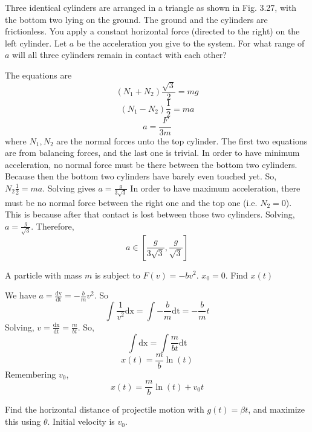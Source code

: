 \documentclass[11pt]{scrartcl}
\newcommand{\ca}[1]{\mathrm{#1}}
\begin{document}
\begin{example}
  [3.33]
\end{example}
\begin{soln}
\end{soln}
\begin{example}
  [3.34]
  Three identical cylinders are arranged in a triangle as shown in Fig. 3.27,
  with the bottom two lying on the ground. The ground and the cylinders
  are frictionless. You apply a constant horizontal force (directed to the
  right) on the left cylinder. Let $a$ be the acceleration you give to the
  system. For what range of $a$ will all three cylinders remain in contact
  with each other?
\end{example}
\begin{soln}
  The equations are
  $$(N_1+N_2)\frac{\sqrt{3}}{2}=mg$$
  $$(N_1-N_2)\frac{1}{2}=ma$$
  $$a=\frac{F}{3m}$$
  where $N_1,N_2$ are the normal forces unto the top cylinder.
  The first two equations are from balancing forces, and the last one is trivial.
  In order to have minimum acceleration, no normal force must be there
  between the bottom two cylinders. Because then the bottom two cylinders have barely even touched yet. So, $N_2\frac{1}{2}=ma$. Solving gives
  $a=\frac{g}{3\sqrt{3}}$
  In order to have maximum acceleration, there must be no normal force between
  the right one and the top one (i.e. $N_2=0$). This is because after that
  contact is lost between those two cylinders. Solving, $a=\frac{g}{\sqrt{3}}$.
  Therefore,
  $$a\in \left[\frac{g}{3\sqrt{3}}, \frac{g}{\sqrt{3}}\right]$$
\end{soln}
\begin{example}
  [3.36]
\end{example}
\begin{soln}
\end{soln}
\begin{example}
  [3.37]
  A particle with mass $m$ is subject to $F(v)=-bv^2$. $x_0=0$. Find $x(t)$
\end{example}
\begin{soln}
  We have $a=\frac{\ca{dv}}{\ca{dt}}=-\frac{b}{m}v^2$.
  So
  $$\int \frac{1}{v^2}\ca{dx}=\int -\frac{b}{m}\ca{dt}=-\frac{b}{m}t$$
  Solving, $v=\frac{\ca{dx}}{\ca{dt}}=\frac{m}{bt}$. So,
  $$\int \ca{dx}=\int \frac{m}{bt}\ca{dt}$$
  $$x(t)=\frac{m}{b}\ln(t)$$
  Remembering $v_0$,
  $$x(t)=\frac{m}{b}\ln(t)+v_0t$$
\end{soln}
\begin{example}
  [3.43]
  Find the horizontal distance of projectile motion with $g(t)=\beta t$, and maximize this using $\theta$. Initial velocity is $v_0$.
\end{example}
\end{document}
